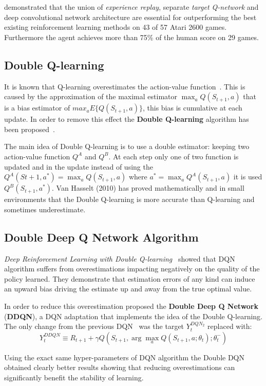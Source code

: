 \citeauthor{Mnih2015}  demonstrated that the union of \textit{experience replay}, separate \textit{target Q-network} and deep convolutional network architecture are essential for outperforming the best existing reinforcement learning methods on 43 of 57 Atari 2600 games. Furthermore the agent achieves more than 75\% of the human score on 29 games.



\subsection{Double Q-learning}
\label{subsec:DoubleQlearning}

It is known that Q-learning overestimates the action-value function~\cite{NIPS2010_3964}. This is caused by the approximation of the maximal estimator $\max_a Q(S_{t+1}, a)$ that is a bias estimator of $max_a E \{ Q(S_{t+1}, a) \}$, this bias is cumulative at each update. In order to remove this effect the \textbf{Double Q-learning} algorithm has been proposed~\cite{NIPS2010_3964}.

The main idea of Double Q-learning is to use a double estimator: keeping two action-value function $Q^A$ and $Q^B$. At each step only one of two function is updated and in the update instead of using the $Q^A(S{t+1}, a^*) = \max_a Q(S_{t+1}, a)$ where $a^* = \max_a Q^A(S_{t+1}, a)$ it is used $Q^B(S_{t+1}, a^*)$.
Van Hasselt (2010) has proved mathematically and in small environments that the Double Q-learning is more accurate than Q-learning and sometimes underestimate.

\subsection{Double Deep Q Network Algorithm}

\textit{Deep Reinforcement Learning with Double Q-learning}~\cite{Hasselt:2016:DRL:3016100.3016191} showed that DQN algorithm suffers from overestimations impacting negatively on the quality of the policy learned. They demonstrate that estimation errors of any kind can induce an upward bias driving the estimate up and away from the true optimal value.

In order to reduce this overestimation \citeauthor{Hasselt:2016:DRL:3016100.3016191}  proposed the \textbf{Double Deep Q Network} (\textbf{DDQN}), a DQN adaptation that implements the idea of the Double Q-learning. The only change from the previous DQN~\cite{Mnih2015} was the target $Y_t^{DQN_2}$ replaced with:
\begin{equation}
	Y^{DDQN}_t \equiv R_{t+1} + \gamma Q(S_{t+1}, 
		\arg\max_{a} Q(S_{t+1}, a; \theta_t); \theta_t^-)
\end{equation}

Using the exact same hyper-parameters of DQN algorithm the Double DQN obtained clearly better results showing that reducing overestimations can significantly benefit the stability of learning.


